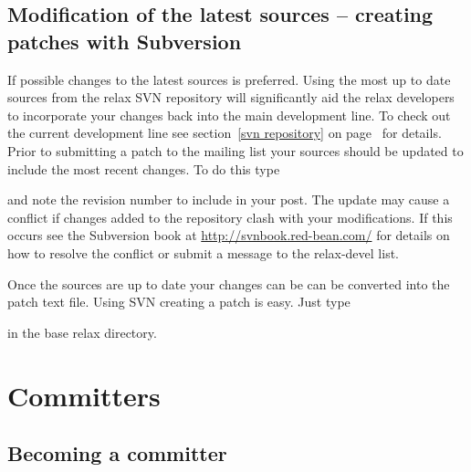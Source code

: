 


\subsection{Modification of the latest sources -- creating patches with Subversion}

If possible changes to the latest sources is preferred.  Using the most up to date sources from the relax SVN repository will significantly aid the relax developers to incorporate your changes back into the main development line.  To check out the current development line see section~\ref{svn repository} on page~\pageref{svn repository} for details.  Prior to submitting a patch to the mailing list your sources should be updated to include the most recent changes.  To do this type


and note the revision number to include in your post.  The update may cause a conflict if changes added to the repository clash with your modifications.  If this occurs see the Subversion book at \href{http://svnbook.red-bean.com/}{http://svnbook.red-bean.com/} for details on how to resolve the conflict or submit a message to the rela\mbox{x-d}evel list.

Once the sources are up to date your changes can be can be converted into the patch text file.  Using SVN creating a patch is easy.  Just type


in the base relax directory.




\section{Committers}


\subsection{Becoming a committer}\label{becoming a committer}

